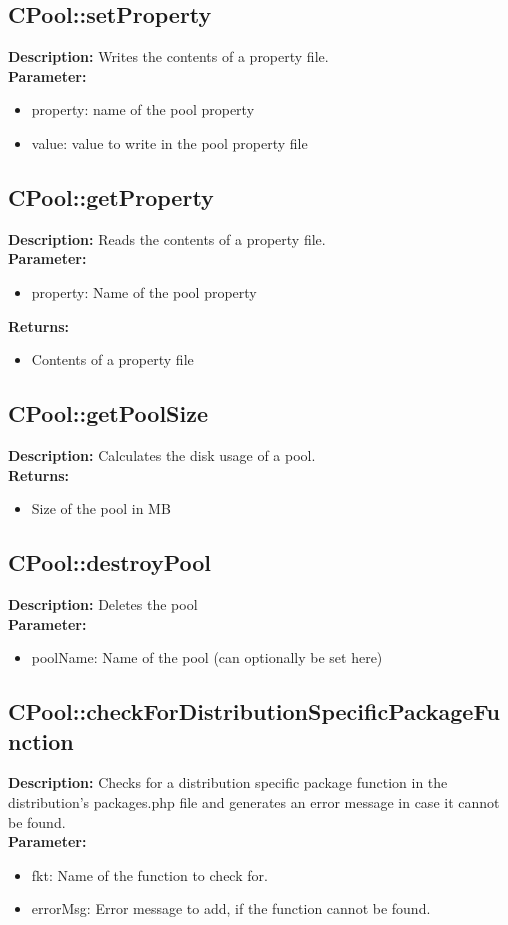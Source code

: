 \subsection{CPool::setProperty}
\textbf{Description:} Writes the contents of a property file.\\
\textbf{Parameter:}
\begin{itemize}
\item property: name of the pool property
\item value: value to write in the pool property file
\end{itemize}

\subsection{CPool::getProperty}
\textbf{Description:} Reads the contents of a property file.\\
\textbf{Parameter:}
\begin{itemize}
\item property: Name of the pool property
\end{itemize}
\textbf{Returns:}
\begin{itemize}
\item Contents of a property file
\end{itemize}

\subsection{CPool::getPoolSize}
\textbf{Description:} Calculates the disk usage of a pool.\\
\textbf{Returns:}
\begin{itemize}
\item Size of the pool in MB
\end{itemize}

\subsection{CPool::destroyPool}
\textbf{Description:} Deletes the pool\\
\textbf{Parameter:}
\begin{itemize}
\item poolName: Name of the pool (can optionally be set here)
\end{itemize}

\subsection{CPool::checkForDistributionSpecificPackageFunction}
\textbf{Description:} Checks for a distribution specific package function in the distribution's packages.php file and generates an error message in case it cannot be found.\\
\textbf{Parameter:}
\begin{itemize}
\item fkt: Name of the function to check for.
\item errorMsg: Error message to add, if the function cannot be found.
\end{itemize}

